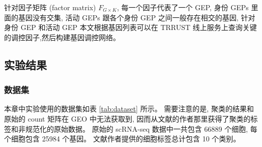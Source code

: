 针对因子矩阵 (factor matrix) $F_{G \times K}$, 每一个因子代表了一个 GEP, 
身份 GEPs 里面的基因没有交集, 活动 GEPs 跟各个身份 GEP 之间一般存在相交的基因, 
针对身份 GEP 和活动 GEP 本文根据基因列表可以在 TRRUST 线上服务上查询关键的调控因子,然后构建基因调控网络。

\subsection{实验结果}
\subsubsection{数据集}
本章中实验使用的数据集如表 \ref{tab:dataset} 所示。
需要注意的是, 聚类的结果和原始的 count 矩阵在 GEO 中无法获取到,
因而从文献的作者那里获得了聚类的标签和非规范化的原始数据。
原始的 scRNA-seq 数据中一共包含 66889 个细胞, 每个细胞包含 25984 个基因。
文献作者提供的细胞标签总计包含 10 个类别。

\begin{table}[!htbp]
    \caption{\label{tab:dataset}使用的公开数据集} 
\end{table}

